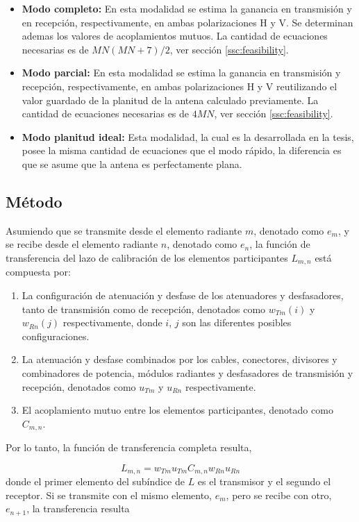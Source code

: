 \begin{itemize}
	\item \textbf{Modo completo:} En esta modalidad se estima la ganancia en transmisión y en recepción, respectivamente, en ambas
		polarizaciones H y V. Se determinan ademas los valores de acoplamientos mutuos. La cantidad de ecuaciones necesarias es de
		$MN(MN + 7)/2$, ver sección \ref{ssc:feasibility}.
	\item \textbf{Modo parcial:} En esta modalidad se estima la ganancia en transmisión y recepción, respectivamente, en ambas
		polarizaciones H y V reutilizando el valor guardado de la planitud de la antena calculado previamente. La cantidad de
		ecuaciones necesarias es de $4MN$, ver sección \ref{ssc:feasibility}.
	\item \textbf{Modo planitud ideal:} Esta modalidad, la cual es la desarrollada en la tesis, posee la misma cantidad de
		ecuaciones que el modo rápido, la diferencia es que se asume que la antena es perfectamente plana.
\end{itemize}


\subsection{Método}

Asumiendo que se transmite desde el elemento radiante $m$, denotado como $e_m$, y se recibe desde el elemento radiante $n$,
denotado como $e_n$, la función de transferencia del lazo de calibración de los elementos participantes $L_{m,n}$ está
compuesta por:

\begin{enumerate}
	\item La configuración de atenuación y desfase de los atenuadores y desfasadores, tanto de transmisión como de recepción,
		denotados como $w_{Tm}(i)$ y $w_{Rn}(j)$ respectivamente, donde $i$, $j$ son las diferentes posibles configuraciones.
	\item La atenuación y desfase combinados por los cables, conectores, divisores y combinadores de potencia, módulos radiantes
		y desfasadores de transmisión y recepción, denotados como $u_{Tm}$ y $u_{Rn}$ respectivamente.
	\item El acoplamiento mutuo entre los elementos participantes, denotado como $C_{m, n}$.
\end{enumerate}

Por lo tanto, la función de transferencia completa resulta,

\begin{equation}
	L_{m,n} = w_{Tm} u_{Tm} C_{m,n} w_{Rn} u_{Rn}
	\label{eq:transfer_mn}
\end{equation}
donde el primer elemento del subíndice de $L$ es el transmisor y el segundo el receptor. Si se transmite con el mismo elemento,
$e_m$, pero se recibe con otro, $e_{n + 1}$, la transferencia resulta

